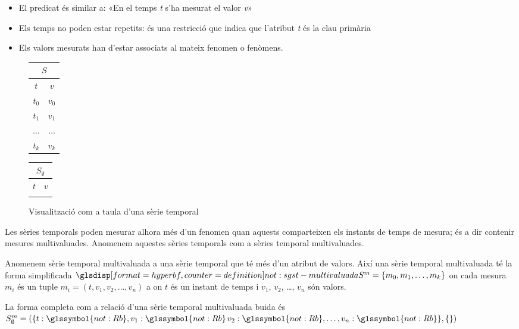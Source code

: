 \begin{itemize}
\item El predicat és similar a: «En el temps \emph{t} s'ha mesurat el
  valor \emph{v}»
\item Els temps no poden estar repetits: és una restricció que indica
  que l'atribut \emph{t} és la clau primària
\item Els valors mesurats han d'estar associats al mateix fenomen o
  fenòmens.
\end{itemize}
\begin{figure}[tp]
  \centering
  \begin{tabular}[c]{|c|c|}
    \multicolumn{2}{c}{$S$} \\ \hline
    $t$  & $v$ \\ \hline
    $t_0$  & $v_0$ \\
    $t_1$  & $v_1$ \\
    $\dots$  & $\dots$ \\ 
    $t_k$  & $v_k$ \\ \hline
  \end{tabular} \qquad
  \begin{tabular}[c]{|c|c|}
    \multicolumn{2}{c}{$S_{\emptyset}$} \\ \hline
    $t$  & $v$ \\ \hline
      &  \\ \hline
  \end{tabular}
  \caption{Visualització com a taula d'una sèrie temporal}
  \label{fig:model:serietemporal:taula}
\end{figure}













Les sèries temporals poden mesurar alhora més d'un fenomen quan
aquests comparteixen els instants de temps de mesura; és a dir
contenir mesures multivaluades.  Anomenem aquestes sèries temporals
com a sèries temporal multivaluades.
\begin{definition}
  Anomenem sèrie temporal multivaluada a una sèrie temporal que té més
  d'un atribut de valors. Així una sèrie temporal multivaluada té la
  forma simplificada $\glsdispdef{not:sgst-multivaluada}{S^m = \{ m_0,
    m_1 , \dotsc, m_k \}}$ on cada mesura $m_i$ és un tuple
  $m_i=(t,v_1,v_2,\dotsc,v_n)$ a on $t$ és un instant de temps i
  $v_1$, $v_2$, \dots, $v_n$ són valors.

  La forma completa com a relació d'una sèrie temporal multivaluada
  buida és $S^m_{\emptyset} = ( \{t: \glssymbol{not:Rb}, v_1: \glssymbol{not:Rb}\, v_2:
  \glssymbol{not:Rb}, \dotsc, v_n: \glssymbol{not:Rb}\}, \{ \} )$
\end{definition}

